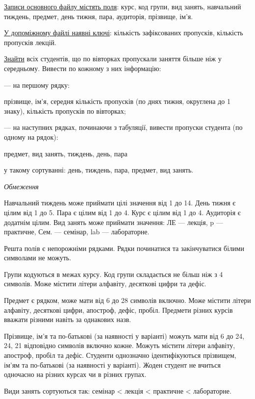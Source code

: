 \documentclass[11pt, ukrainian]{article}
\begin{document}
\underline{Записи основного файлу містять поля}: курс, код групи, вид занять, навчальний тиждень, предмет, день тижня, пара, аудиторія, прізвище, ім’я.

\underline{У допоміжному файлі наявні ключі}: кількість зафіксованих пропусків, кількість пропусків лекцій.

\underline{Знайти} всіх студентів, що по вівторках пропускали заняття більше ніж у середньому. Вивести по кожному з них інформацію:\par
{\noindent}--- на першому рядку:\par
прізвище, ім’я, середня кількість пропусків (по днях тижня, округлена до 1 знаку), кількість пропусків по вівторках;

{\noindent}--- на наступних рядках, починаючи з табуляції, вивести пропуски студента (по одному на рядок):\par
предмет, вид занять, тиждень, день, пара

{\noindent}у такому сортуванні: день, тиждень, пара, предмет, вид занять.


\bigskip\textit{Обмеження}

Навчальний тиждень може приймати цілі значення від 1 до 14.
День тижня є цілим від 1 до 5. Пара є цілим від 1 до 4.
Курс є цілим від 1 до 4. Аудиторія є додатнім цілим.
Вид занять може приймати значення:
ЛЕ --- лекція, p --- практичне, Сем. --- семінар, lab --- лабораторне.

Решта полів є непорожніми рядками.
Рядки починатися та закінчуватися білими символами не можуть.

Групи кодуються в межах курсу.
Код групи складається не більш ніж з 4 символів.
Може містити літери алфавіту, десяткові цифри та дефіс.

Предмет є рядком, може мати від 6 до 28 символів включно.
Може містити літери алфавіту, десяткові цифри, апостроф, дефіс, пробіл.
Предмети різних курсів вважати різними навіть за однакових назв.

Прізвище, ім’я та по-батькові (за наявності у варіанті)
можуть мати від 6 до 24, 24, 21 відповідно символів включно кожне.
Можуть містити літери алфавіту, апостроф, пробіл та дефіс.
Студенти однозначно ідентифікуються прізвищем, ім’ям та по-батькові (за наявності у варіанті).
Жоден студент не вчиться одночасно на різних курсах чи в різних групах.

Види занять сортуються так: семінар < лекція < практичне < лабораторне.
\end{document}
